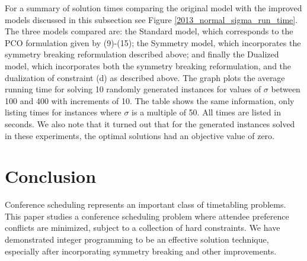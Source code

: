 \documentclass{svjour3}                     %
\begin{document}
For a summary of solution times comparing the original model with the improved models discussed in this subsection see Figure \ref{2013_normal_sigma_run_time}. 
The three models compared are: the Standard model, which corresponds to the PCO formulation given by (9)-(15); the Symmetry model, which incorporates the symmetry breaking reformulation described above; and finally the Dualized model, which incorporates both the symmetry breaking reformulation, and the dualization of constraint (d) as described above.
The graph plots the average running time for solving 10 randomly generated instances for values of $\sigma$ between 100 and 400 with increments of 10. 
The table shows the same information, only listing times for instances where $\sigma$ is a multiple of 50.
All times are listed in seconds.
We also note that it turned out that for the generated instances solved in these experiments, the optimal solutions had an objective value of zero.


\section{Conclusion}\label{sec.conclusion}
Conference scheduling represents an important class of timetabling problems.
This paper studies a conference scheduling problem where attendee preference conflicts are minimized, subject to a collection of hard constraints.
We have demonstrated integer programming to be an effective solution technique, especially after incorporating symmetry breaking and other improvements.
	
\end{document}
